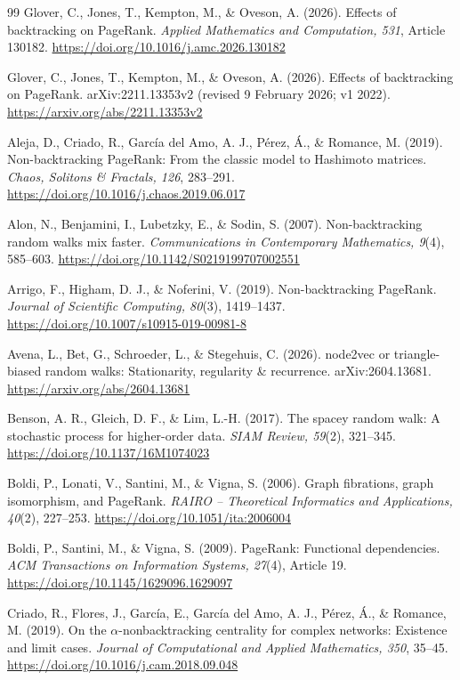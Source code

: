 \documentclass[11pt,a4paper]{article}
\theoremstyle{definition}\newtheorem{conjecture}{Conjecture}
\theoremstyle{remark}\newtheorem{remark}[theorem]{Remark}
\begin{document}
\begin{thebibliography}{99}\small
{}
Glover, C., Jones, T., Kempton, M., \& Oveson, A. (2026).
Effects of backtracking on PageRank.
\emph{Applied Mathematics and Computation, 531}, Article 130182.
\url{https://doi.org/10.1016/j.amc.2026.130182}

Glover, C., Jones, T., Kempton, M., \& Oveson, A. (2026).
Effects of backtracking on PageRank. arXiv:2211.13353v2 (revised 9 February 2026; v1 2022).
\url{https://arxiv.org/abs/2211.13353v2}

Aleja, D., Criado, R., Garc\'ia del Amo, A. J., P\'erez, \'A., \& Romance, M. (2019).
Non-backtracking PageRank: From the classic model to Hashimoto matrices.
\emph{Chaos, Solitons \& Fractals, 126}, 283--291.
\url{https://doi.org/10.1016/j.chaos.2019.06.017}

Alon, N., Benjamini, I., Lubetzky, E., \& Sodin, S. (2007).
Non-backtracking random walks mix faster.
\emph{Communications in Contemporary Mathematics, 9}(4), 585--603.
\url{https://doi.org/10.1142/S0219199707002551}

Arrigo, F., Higham, D. J., \& Noferini, V. (2019).
Non-backtracking PageRank.
\emph{Journal of Scientific Computing, 80}(3), 1419--1437.
\url{https://doi.org/10.1007/s10915-019-00981-8}

Avena, L., Bet, G., Schroeder, L., \& Stegehuis, C. (2026).
node2vec or triangle-biased random walks: Stationarity, regularity \& recurrence. arXiv:2604.13681.
\url{https://arxiv.org/abs/2604.13681}

Benson, A. R., Gleich, D. F., \& Lim, L.-H. (2017).
The spacey random walk: A stochastic process for higher-order data.
\emph{SIAM Review, 59}(2), 321--345.
\url{https://doi.org/10.1137/16M1074023}

Boldi, P., Lonati, V., Santini, M., \& Vigna, S. (2006).
Graph fibrations, graph isomorphism, and PageRank.
\emph{RAIRO -- Theoretical Informatics and Applications, 40}(2), 227--253.
\url{https://doi.org/10.1051/ita:2006004}

Boldi, P., Santini, M., \& Vigna, S. (2009).
PageRank: Functional dependencies.
\emph{ACM Transactions on Information Systems, 27}(4), Article 19.
\url{https://doi.org/10.1145/1629096.1629097}

Criado, R., Flores, J., Garc\'ia, E., Garc\'ia del Amo, A. J., P\'erez, \'A., \& Romance, M. (2019).
On the $\alpha$-nonbacktracking centrality for complex networks: Existence and limit cases.
\emph{Journal of Computational and Applied Mathematics, 350}, 35--45.
\url{https://doi.org/10.1016/j.cam.2018.09.048}


\end{thebibliography}
\end{document}
